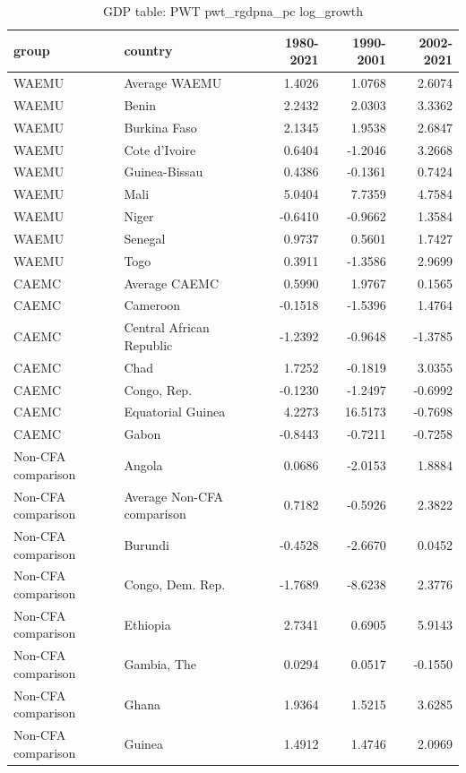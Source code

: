 \begin{table}

\caption{GDP table: PWT pwt_rgdpna_pc log_growth}
\centering
\begin{tabular}[t]{llrrr}
\toprule
group & country & 1980-2021 & 1990-2001 & 2002-2021\\
\midrule
WAEMU & Average WAEMU & 1.4026 & 1.0768 & 2.6074\\
WAEMU & Benin & 2.2432 & 2.0303 & 3.3362\\
WAEMU & Burkina Faso & 2.1345 & 1.9538 & 2.6847\\
WAEMU & Cote d'Ivoire & 0.6404 & -1.2046 & 3.2668\\
WAEMU & Guinea-Bissau & 0.4386 & -0.1361 & 0.7424\\
\addlinespace
WAEMU & Mali & 5.0404 & 7.7359 & 4.7584\\
WAEMU & Niger & -0.6410 & -0.9662 & 1.3584\\
WAEMU & Senegal & 0.9737 & 0.5601 & 1.7427\\
WAEMU & Togo & 0.3911 & -1.3586 & 2.9699\\
CAEMC & Average CAEMC & 0.5990 & 1.9767 & 0.1565\\
\addlinespace
CAEMC & Cameroon & -0.1518 & -1.5396 & 1.4764\\
CAEMC & Central African Republic & -1.2392 & -0.9648 & -1.3785\\
CAEMC & Chad & 1.7252 & -0.1819 & 3.0355\\
CAEMC & Congo, Rep. & -0.1230 & -1.2497 & -0.6992\\
CAEMC & Equatorial Guinea & 4.2273 & 16.5173 & -0.7698\\
\addlinespace
CAEMC & Gabon & -0.8443 & -0.7211 & -0.7258\\
Non-CFA comparison & Angola & 0.0686 & -2.0153 & 1.8884\\
Non-CFA comparison & Average Non-CFA comparison & 0.7182 & -0.5926 & 2.3822\\
Non-CFA comparison & Burundi & -0.4528 & -2.6670 & 0.0452\\
Non-CFA comparison & Congo, Dem. Rep. & -1.7689 & -8.6238 & 2.3776\\
\addlinespace
Non-CFA comparison & Ethiopia & 2.7341 & 0.6905 & 5.9143\\
Non-CFA comparison & Gambia, The & 0.0294 & 0.0517 & -0.1550\\
Non-CFA comparison & Ghana & 1.9364 & 1.5215 & 3.6285\\
Non-CFA comparison & Guinea & 1.4912 & 1.4746 & 2.0969\\

\end{tabular}
\end{table}
